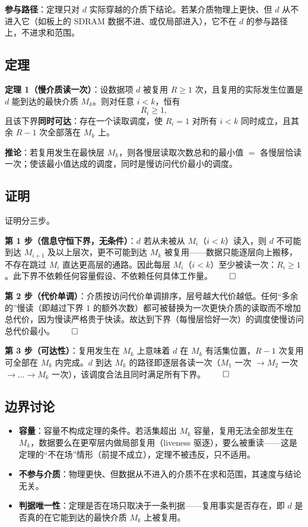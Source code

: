 \documentclass[11pt]{ctexart}
\begin{document}
\textbf{参与路径}：定理只对 $d$ 实际穿越的介质下结论。若某介质物理上更快、但 $d$ 从不进入它（如板上的 SDRAM 数据不进、或仅局部进入），它不在 $d$ 的参与路径上，不进求和范围。

\subsection{定理}

\textbf{定理 1（慢介质读一次）}：设数据项 $d$ 被复用 $R\ge 1$ 次，且复用的实际发生位置是 $d$ 能到达的最快介质 $M_k$。则对任意 $i<k$，恒有
\[
R_i\ge 1,
\]
且该下界\textbf{同时可达}：存在一个读取调度，使 $R_i=1$ 对所有 $i<k$ 同时成立，且其余 $R-1$ 次全部落在 $M_k$ 上。

\textbf{推论}：若复用发生在最快层 $M_k$，则各慢层读取次数总和的最小值 $=$ 各慢层恰读一次；使该最小值达成的调度，同时是慢访问代价最小的调度。

\subsection{证明}

证明分三步。

\textbf{第 1 步（信息守恒下界，无条件）}：$d$ 若从未被从 $M_i$（$i<k$）读入，则 $d$ 不可能到达 $M_{i+1}$ 及以上层次，更不可能到达 $M_k$ 被复用——数据只能逐层向上搬移，不存在跳过 $M_i$ 直达更高层的通路。因此每层 $M_i$（$i<k$）至少被读一次：$R_i\ge 1$。此下界不依赖任何容量假设、不依赖任何具体工作量。\ensuremath{\qed}

\textbf{第 2 步（代价单调）}：介质按访问代价单调排序，层号越大代价越低。任何“多余的”慢读（即越过下界 1 的额外次数）都可被替换为一次更快介质的读取而不增加总代价，因为慢读严格贵于快读。故达到下界（每慢层恰好一次）的调度使慢访问总代价最小。\ensuremath{\qed}

\textbf{第 3 步（可达性）}：复用发生在 $M_k$ 上意味着 $d$ 在 $M_k$ 有活集位置，$R-1$ 次复用可全部在 $M_k$ 内完成。$d$ 到达 $M_k$ 的路径即逐层各读一次（$M_1$ 一次 $\to M_2$ 一次 $\to\dots\to M_k$ 一次），该调度合法且同时满足所有下界。\ensuremath{\qed}

\subsection{边界讨论}

\begin{itemize}
\item \textbf{容量}：容量不构成定理的条件。若活集超出 $M_k$ 容量，复用无法全部发生在 $M_k$，数据要么在更窄层内做局部复用（liveness 驱逐），要么被重读——这是定理的“不在场”情形（前提不成立），定理不被违反，只不适用。
\item \textbf{不参与介质}：物理更快、但数据从不进入的介质不在求和范围，其速度与结论无关。
\item \textbf{判据唯一性}：定理是否在场只取决于一条判据——复用事实是否存在，即 $d$ 是否真的在它能到达的最快介质 $M_k$ 上被复用。
\end{itemize}
\end{document}
